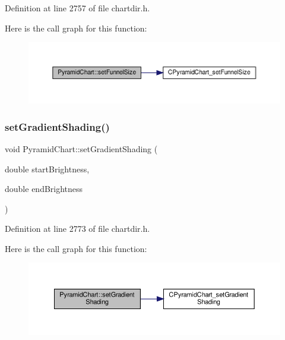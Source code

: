 Definition at line 2757 of file chartdir.\+h.

Here is the call graph for this function\+:
\nopagebreak
\begin{figure}[H]
\begin{center}
\leavevmode
\includegraphics[width=350pt]{class_pyramid_chart_a17f068885ee414fc5113ae1063bf0e39_cgraph}
\end{center}
\end{figure}
\mbox{\label{class_pyramid_chart_ab18e5be206a8c7cc29bc1c79bdb5df2a}} 
\subsubsection{\texorpdfstring{set\+Gradient\+Shading()}{setGradientShading()}}
{\footnotesize\ttfamily void Pyramid\+Chart\+::set\+Gradient\+Shading (\begin{DoxyParamCaption}\item[{double}]{start\+Brightness,  }\item[{double}]{end\+Brightness }\end{DoxyParamCaption})\hspace{0.3cm}{\ttfamily [inline]}}



Definition at line 2773 of file chartdir.\+h.

Here is the call graph for this function\+:
\nopagebreak
\begin{figure}[H]
\begin{center}
\leavevmode
\includegraphics[width=350pt]{class_pyramid_chart_ab18e5be206a8c7cc29bc1c79bdb5df2a_cgraph}
\end{center}
\end{figure}
\mbox{\label{class_pyramid_chart_a61749b6cd05b439b66a00afe9ecca570}} 
